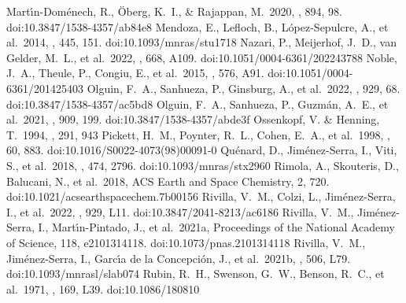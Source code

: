 \documentclass[twocolumn, twocolappendix]{aastex631}
\begin{document}
\begin{thebibliography}{}
 Mart{\'\i}n-Dom{\'e}nech, R., {\"O}berg, K.~I., \& Rajappan, M.\ 2020, \apj, 894, 98. doi:10.3847/1538-4357/ab84e8
 Mendoza, E., Lefloch, B., L{\'o}pez-Sepulcre, A., et al.\ 2014, \mnras, 445, 151. doi:10.1093/mnras/stu1718
 Nazari, P., Meijerhof, J.~D., van Gelder, M.~L., et al.\ 2022, \aap, 668, A109. doi:10.1051/0004-6361/202243788
 Noble, J.~A., Theule, P., Congiu, E., et al.\ 2015, \aap, 576, A91. doi:10.1051/0004-6361/201425403
 Olguin, F.~A., Sanhueza, P., Ginsburg, A., et al.\ 2022, \apj, 929, 68. doi:10.3847/1538-4357/ac5bd8
 Olguin, F.~A., Sanhueza, P., Guzm{\'a}n, A.~E., et al.\ 2021, \apj, 909, 199. doi:10.3847/1538-4357/abde3f
 Ossenkopf, V. \& Henning, T.\ 1994, \aap, 291, 943
 Pickett, H.~M., Poynter, R.~L., Cohen, E.~A., et al.\ 1998, \jqsrt, 60, 883. doi:10.1016/S0022-4073(98)00091-0
 Qu{\'e}nard, D., Jim{\'e}nez-Serra, I., Viti, S., et al.\ 2018, \mnras, 474, 2796. doi:10.1093/mnras/stx2960
 Rimola, A., Skouteris, D., Balucani, N., et al.\ 2018, ACS Earth and Space Chemistry, 2, 720. doi:10.1021/acsearthspacechem.7b00156
 Rivilla, V.~M., Colzi, L., Jim{\'e}nez-Serra, I., et al.\ 2022, \apjl, 929, L11. doi:10.3847/2041-8213/ac6186
 Rivilla, V.~M., Jim{\'e}nez-Serra, I., Mart{\'\i}n-Pintado, J., et al.\ 2021a, Proceedings of the National Academy of Science, 118, e2101314118. doi:10.1073/pnas.2101314118
 Rivilla, V.~M., Jim{\'e}nez-Serra, I., Garc{\'\i}a de la Concepci{\'o}n, J., et al.\ 2021b, \mnras, 506, L79. doi:10.1093/mnrasl/slab074
 Rubin, R.~H., Swenson, G.~W., Benson, R.~C., et al.\ 1971, \apjl, 169, L39. doi:10.1086/180810

\end{thebibliography}
\end{document}

